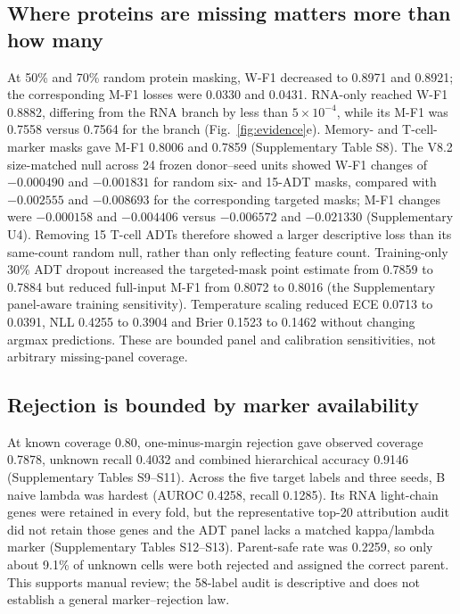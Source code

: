 \documentclass[unnumsec,webpdf,contemporary,large,numbered]{oup-authoring-template}
\begin{document}
\subsection{Where proteins are missing matters more than how many}

At 50\% and 70\% random protein masking, W-F1 decreased to 0.8971 and 0.8921; the corresponding M-F1 losses were 0.0330 and 0.0431. RNA-only reached W-F1 0.8882, differing from the RNA branch by less than $5\times10^{-4}$, while its M-F1 was 0.7558 versus 0.7564 for the branch (Fig.~\ref{fig:evidence}e). Memory- and T-cell-marker masks gave M-F1 0.8006 and 0.7859 (Supplementary Table S8). The V8.2 size-matched null across 24 frozen donor--seed units showed W-F1 changes of $-0.000490$ and $-0.001831$ for random six- and 15-ADT masks, compared with $-0.002555$ and $-0.008693$ for the corresponding targeted masks; M-F1 changes were $-0.000158$ and $-0.004406$ versus $-0.006572$ and $-0.021330$ (Supplementary U4). Removing 15 T-cell ADTs therefore showed a larger descriptive loss than its same-count random null, rather than only reflecting feature count. Training-only 30\% ADT dropout increased the targeted-mask point estimate from 0.7859 to 0.7884 but reduced full-input M-F1 from 0.8072 to 0.8016 (the Supplementary panel-aware training sensitivity). Temperature scaling reduced ECE 0.0713 to 0.0391, NLL 0.4255 to 0.3904 and Brier 0.1523 to 0.1462 without changing argmax predictions. These are bounded panel and calibration sensitivities, not arbitrary missing-panel coverage.

\subsection{Rejection is bounded by marker availability}

At known coverage 0.80, one-minus-margin rejection gave observed coverage 0.7878, unknown recall 0.4032 and combined hierarchical accuracy 0.9146 (Supplementary Tables S9--S11). Across the five target labels and three seeds, B naive lambda was hardest (AUROC 0.4258, recall 0.1285). Its RNA light-chain genes were retained in every fold, but the representative top-20 attribution audit did not retain those genes and the ADT panel lacks a matched kappa/lambda marker (Supplementary Tables S12--S13). Parent-safe rate was 0.2259, so only about 9.1\% of unknown cells were both rejected and assigned the correct parent. This supports manual review; the 58-label audit is descriptive and does not establish a general marker--rejection law.
\end{document}
